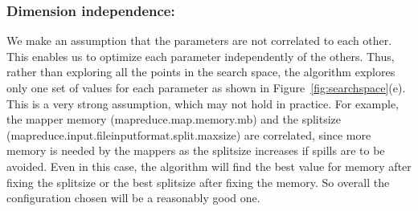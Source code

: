 \noindent\subsubsection*{\bf Dimension independence: } 
We make an assumption that the parameters are not correlated to each other. This enables us to optimize each parameter independently of the others. Thus, rather than exploring all the points in the search space, the algorithm explores only one set of values for each parameter as shown in Figure~\ref{fig:searchspace}(e). This is a very strong assumption, which may not hold in practice. For example, the mapper memory (mapreduce.map.memory.mb) and the splitsize (mapreduce.input.fileinputformat.split.maxsize) are correlated, since more memory is needed by the mappers as the splitsize increases if spills are to be avoided. Even in this case, the algorithm will find the best value for memory after fixing the splitsize or the best splitsize after fixing the memory. So overall the configuration chosen will be a reasonably good one.

